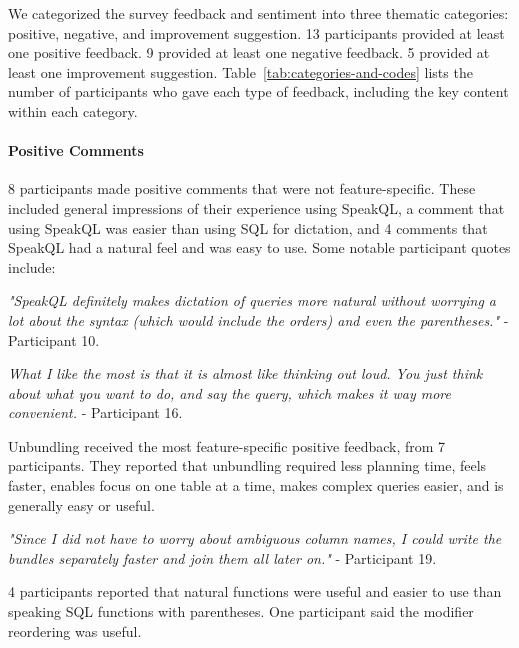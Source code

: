 \thematiccoding

We categorized the survey feedback and sentiment into three thematic categories: positive, negative, and improvement suggestion. 13 participants provided at least one positive feedback. 
9 provided at least one negative feedback. 5 provided at least one improvement suggestion. 
Table~\ref{tab:categories-and-codes} lists the number of participants who gave each type of feedback, including the key content within each category. 

\paragraph{\textbf{Positive Comments}} 
8 participants made positive comments that were not feature-specific. 
These included general impressions of their experience using SpeakQL, a comment that using SpeakQL was easier than using SQL for dictation, and 4 comments that SpeakQL had a natural feel and was easy to use.
Some notable participant quotes include: 

\vspace{1mm}
\emph{"SpeakQL definitely makes dictation of queries more natural without worrying a lot about the syntax (which would include the orders) and even the parentheses."}
- Participant 10.

\vspace{1mm}
\emph{What I like the most is that it is almost like thinking out loud. You just think about what you want to do, and say the query, which makes it way more convenient.}
- Participant 16.

\vspace{1mm}
Unbundling received the most feature-specific positive feedback, from 7 participants. 
They reported that unbundling required less planning time, feels faster, enables focus on one table at a time, makes complex queries easier, and is generally easy or useful.

\vspace{1mm}
\emph{"Since I did not have to worry about ambiguous column names, I could write the bundles separately faster and join them all later on."}
- Participant 19.

\vspace{1mm}
4 participants reported that natural functions were useful and easier to use than speaking SQL functions with parentheses. One participant said the modifier reordering was useful.


